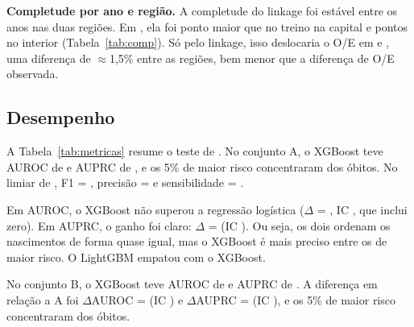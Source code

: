 \documentclass[12pt]{article}
\begin{document}
\textbf{Completude por ano e região.} A completude do linkage foi estável entre os anos nas duas regiões. Em \anoTeste{}, ela foi \compDifCap{} ponto maior que no treino na capital e \compDifInt{} pontos no interior (Tabela~\ref{tab:comp}). Só pelo linkage, isso deslocaria o O/E em \oeLinkCap{} e \oeLinkInt{}, uma diferença de $\approx$1,5\% entre as regiões, bem menor que a diferença de O/E observada.

\begin{table}[!htbp]
\centering
\caption{Completude do linkage e O/E por região (XGBoost recalibrado, teste de \anoTeste).}
\label{tab:comp}
\small
\setlength{\tabcolsep}{4pt}
\tabCompletude
\end{table}

\begin{table}[!htbp]
\centering
\caption{Óbitos neonatais pareados $\times$ não pareados, pelas informações da Declaração de Óbito.}
\label{tab:vies}
\small
\tabVies
\end{table}

\subsection{Desempenho}

A Tabela~\ref{tab:metricas} resume o teste de \anoTeste{}. No conjunto A, o XGBoost teve AUROC de \AXgbAurocIC{} e AUPRC de \AXgbAuprcIC{}, e os 5\% de maior risco concentraram \AXgbTop{} dos óbitos. No limiar de \anoValid{}, F1 = \AXgbFum{}, precisão = \AXgbPrec{} e sensibilidade = \AXgbSens{}.

Em AUROC, o XGBoost não superou a regressão logística ($\Delta$ = \dXLa{}, IC \dXLaIC{}, que inclui zero). Em AUPRC, o ganho foi claro: $\Delta$ = \dXLaprc{} (IC \dXLaprcIC{}). Ou seja, os dois ordenam os nascimentos de forma quase igual, mas o XGBoost é mais preciso entre os de maior risco. O LightGBM empatou com o XGBoost.

No conjunto B, o XGBoost teve AUROC de \BXgbAurocIC{} e AUPRC de \BXgbAuprcIC{}. A diferença em relação a A foi $\Delta$AUROC = \dAB{} (IC \dABIC{}) e $\Delta$AUPRC = \dABprc{} (IC \dABprcIC{}), e os 5\% de maior risco concentraram \BXgbTop{} dos óbitos.

\begin{table}[!htbp]
\centering
\caption{Desempenho no teste de \anoTeste{} (IC 95\% por bootstrap). AUROC, AUPRC e top 5\% pelo escore bruto; F1, precisão e sensibilidade no limiar escolhido em \anoValid{}.}
\label{tab:metricas}
\small
\setlength{\tabcolsep}{4pt}
\tabMetricas
\end{table}
\end{document}
